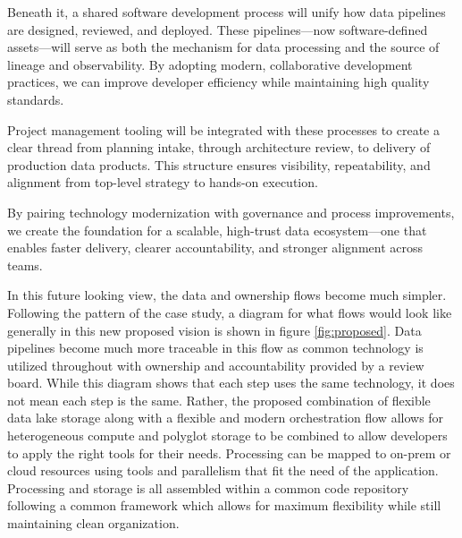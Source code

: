 \documentclass{article}
\begin{document}
Beneath it, a shared software development process will unify how data pipelines are designed, reviewed, and deployed. These pipelines—now software-defined assets—will serve as both the mechanism for data processing and the source of lineage and observability. By adopting modern, collaborative development practices, we can improve developer efficiency while maintaining high quality standards.

Project management tooling will be integrated with these processes to create a clear thread from planning intake, through architecture review, to delivery of production data products. This structure ensures visibility, repeatability, and alignment from top-level strategy to hands-on execution.

By pairing technology modernization with governance and process improvements, we create the foundation for a scalable, high-trust data ecosystem—one that enables faster delivery, clearer accountability, and stronger alignment across teams.

In this future looking view, the data and ownership flows become much simpler. Following the pattern of the case study, a diagram for what flows would look like generally in this new proposed vision is shown in figure \ref{fig:proposed}. Data pipelines become much more traceable in this flow as common technology is utilized throughout with ownership and accountability provided by a review board. While this diagram shows that each step uses the same technology, it does not mean each step is the same. Rather, the proposed combination of flexible data lake storage along with a flexible and modern orchestration flow allows for heterogeneous compute and polyglot storage to be combined to allow developers to apply the right tools for their needs. Processing can be mapped to on-prem or cloud resources using tools and parallelism that fit the need of the application. Processing and storage is all assembled within a common code repository following a common framework which allows for maximum flexibility while still maintaining clean organization. 
\end{document}
